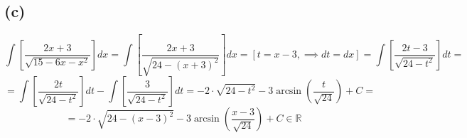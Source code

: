 \documentclass{article}
\begin{document}
\subsection*{(c)}
$$\int\left[\frac{2x + 3}{\sqrt{15 - 6x - x^2}}\right]dx = \int\left[\frac{2x + 3}{\sqrt{24 - (x + 3)^2}}\right]dx = \left[t = x - 3,\implies dt = dx\right] = \int\left[\frac{2t - 3}{\sqrt{24 - t^2}}\right]dt = $$
$$ = \int\left[\frac{2t}{\sqrt{24 - t^2}}\right]dt - \int\left[\frac{3}{\sqrt{24 - t^2}}\right]dt = -2\cdot\sqrt{24 - t^2} - 3\arcsin{\left(\frac{t}{\sqrt{24}}\right)} + C = $$
$$ = -2\cdot\sqrt{24 - (x - 3)^2} - 3\arcsin{\left(\frac{x - 3}{\sqrt{24}}\right)} + C\in\mathbb{R}$$
\end{document}
